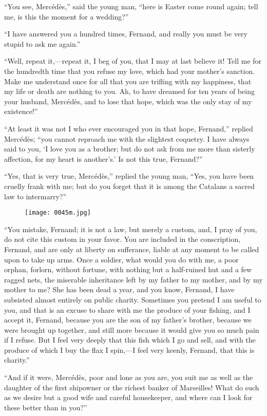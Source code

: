 “You see, Mercédès,” said the young man, “here is Easter come round
again; tell me, is this the moment for a wedding?”

“I have answered you a hundred times, Fernand, and really you must be
very stupid to ask me again.”

“Well, repeat it,—repeat it, I beg of you, that I may at last believe
it! Tell me for the hundredth time that you refuse my love, which had
your mother’s sanction. Make me understand once for all that you are
trifling with my happiness, that my life or death are nothing to you.
Ah, to have dreamed for ten years of being your husband, Mercédès, and
to lose that hope, which was the only stay of my existence!”

“At least it was not I who ever encouraged you in that hope, Fernand,”
replied Mercédès; “you cannot reproach me with the slightest coquetry.
I have always said to you, ‘I love you as a brother; but do not ask
from me more than sisterly affection, for my heart is another’s.’ Is
not this true, Fernand?”

“Yes, that is very true, Mercédès,” replied the young man, “Yes, you
have been cruelly frank with me; but do you forget that it is among the
Catalans a sacred law to intermarry?”

\begin{figure}[ht]
\texttt{[image: 0045m.jpg]}
\end{figure}

“You mistake, Fernand; it is not a law, but merely a custom, and, I
pray of you, do not cite this custom in your favor. You are included in
the conscription, Fernand, and are only at liberty on sufferance,
liable at any moment to be called upon to take up arms. Once a soldier,
what would you do with me, a poor orphan, forlorn, without fortune,
with nothing but a half-ruined hut and a few ragged nets, the miserable
inheritance left by my father to my mother, and by my mother to me? She
has been dead a year, and you know, Fernand, I have subsisted almost
entirely on public charity. Sometimes you pretend I am useful to you,
and that is an excuse to share with me the produce of your fishing, and
I accept it, Fernand, because you are the son of my father’s brother,
because we were brought up together, and still more because it would
give you so much pain if I refuse. But I feel very deeply that this
fish which I go and sell, and with the produce of which I buy the flax
I spin,—I feel very keenly, Fernand, that this is charity.”

“And if it were, Mercédès, poor and lone as you are, you suit me as
well as the daughter of the first shipowner or the richest banker of
Marseilles! What do such as we desire but a good wife and careful
housekeeper, and where can I look for these better than in you?”


